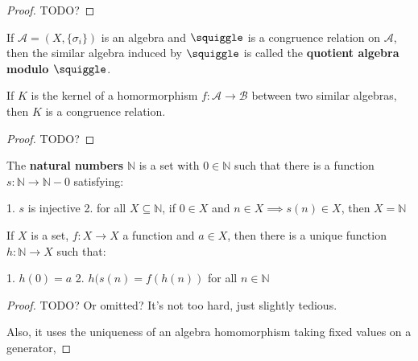 \begin{proof}
TODO?

\end{proof}


\begin{definition}
\label{def-quotient-algebra}

If $\mathcal{A} = (X, \{\sigma_i\})$ is an algebra and $\squiggle$ is a congruence relation on $\mathcal{A}$, then the similar algebra induced by $\squiggle$ is called the \textbf{quotient algebra modulo $\squiggle$}.

\end{definition}


\begin{proposition}
\label{prop-kernel-is-congrel}

If $K$ is the kernel of a homormorphism $f: \mathcal{A} \rightarrow \mathcal{B}$ between two similar algebras, then $K$ is a congruence relation.

\end{proposition}

\begin{proof}
TODO?

\end{proof}

\begin{definition}
\label{def-natural-numbers}
The \textbf{natural numbers} $\mathbb{N}$ is a set with $0 \in \mathbb{N}$ such that there is a function $s: \mathbb{N} \rightarrow \mathbb{N} - 0$ satisfying:

1. $s$ is injective
2. for all $X \subseteq \mathbb{N}$, if $0 \in X$ and $n \in X \implies s(n) \in X$, then $X = \mathbb{N}$
\end{definition}


\begin{theorem}
\label{theorem-recursion-natural-numbers}

If $X$ is a set, $f: X \rightarrow X$ a function and $a \in X$, then there is a unique function $h: \mathbb{N} \rightarrow X$ such that:

1. $h(0) = a$
2. $h(s(n) = f(h(n))$ for all $n \in \mathbb{N}$

\end{theorem}

\begin{proof}
TODO? Or omitted? It's not too hard, just slightly tedious.

Also, it uses the uniqueness of an algebra homomorphism taking fixed values on a generator,

\end{proof}

